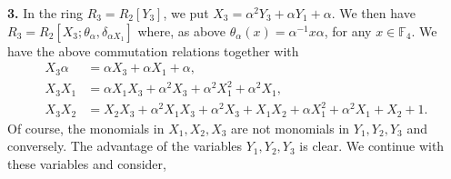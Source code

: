 \documentclass{amsproc}
\numberwithin{equation}{section}
\begin{document}
\noindent \textbf{3.} In the ring $R_3=R_2[Y_3]$, we put $X_3=\alpha^2Y_3+\alpha Y_1 +\alpha$.  We then have  
$R_{3}=R_{2}\left[X_{3} ; \theta_{\alpha}, \delta_{\alpha 
	X_{1}}\right]$ where, as above $\theta_\alpha(x)=\alpha^{-1}x\alpha$, for any $x\in \mathbb{F}_4$.  We have the above commutation relations together with
$$
\begin{aligned}
X_{3} \alpha &=\alpha X_{3}+\alpha X_{1}+\alpha, \\
X_{3} X_{1} &=\alpha X_{1} X_{3}+\alpha^2 X_{3}+\alpha^2X_1^2+\alpha^2X_1, \\
X_{3} X_{2} &=X_{2} X_{3}+\alpha^2 X_1X_3+\alpha^2X_3 
+X_1X_2+\alpha X_1^2 +\alpha^{2} X_{1}+X_2+1.
\end{aligned}
$$
Of course, the monomials in $X_1,X_2,X_3$ are not monomials in $Y_1,Y_2,Y_3$ and conversely.
The advantage of the variables $Y_1,Y_2,Y_3$ is clear.  We continue with these variables and consider,   
\end{document}
